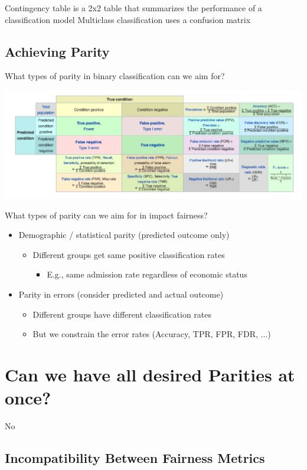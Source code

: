 \documentclass[11pt]{article}
\theoremstyle{definition}
\begin{document}
Contingency table is a 2x2 table that summarizes the performance of a classification model
Multiclass classification uses a confusion matrix

\subsection{Achieving Parity}
What types of parity in binary classification can we aim for?

\includegraphics[width=\textwidth]{3.png}

What types of parity can we aim for in impact fairness?
\begin{itemize}
    \item Demographic / statistical parity (predicted outcome only)
    \begin{itemize}
        \item Different groups get same positive classification rates
        \begin{itemize}
            \item E.g., same admission rate regardless of economic status
        \end{itemize}
    \end{itemize}
    \item Parity in errors (consider predicted and actual outcome)
    \begin{itemize}
        \item Different groups have different classification rates
        \item But we constrain the error rates (Accuracy, TPR, FPR, FDR, ...)
    \end{itemize}
\end{itemize}

\section{Can we have all desired Parities at once?}
No

\subsection{Incompatibility Between Fairness Metrics}
\end{document}
